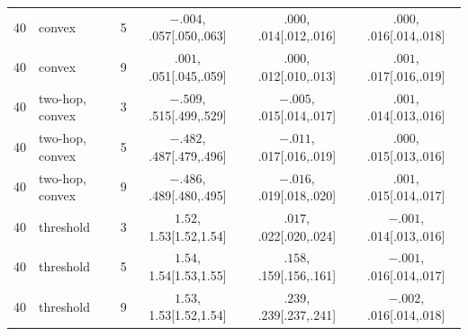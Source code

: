 \begin{tabular}{llrccc}
40 & convex & 5 & $-.004$, .057[.050,.063] & $.000$, .014[.012,.016] & $.000$, .016[.014,.018] \\
40 & convex & 9 & $.001$, .051[.045,.059] & $.000$, .012[.010,.013] & $.001$, .017[.016,.019] \\
40 & two-hop, convex & 3 & $-.509$, .515[.499,.529] & $-.005$, .015[.014,.017] & $.001$, .014[.013,.016] \\
40 & two-hop, convex & 5 & $-.482$, .487[.479,.496] & $-.011$, .017[.016,.019] & $.000$, .015[.013,.016] \\
40 & two-hop, convex & 9 & $-.486$, .489[.480,.495] & $-.016$, .019[.018,.020] & $.001$, .015[.014,.017] \\
40 & threshold & 3 & $1.52$, 1.53[1.52,1.54] & $.017$, .022[.020,.024] & $-.001$, .014[.013,.016] \\
40 & threshold & 5 & $1.54$, 1.54[1.53,1.55] & $.158$, .159[.156,.161] & $-.001$, .016[.014,.017] \\
40 & threshold & 9 & $1.53$, 1.53[1.52,1.54] & $.239$, .239[.237,.241] & $-.002$, .016[.014,.018] \\
\bottomrule
\end{tabular}

